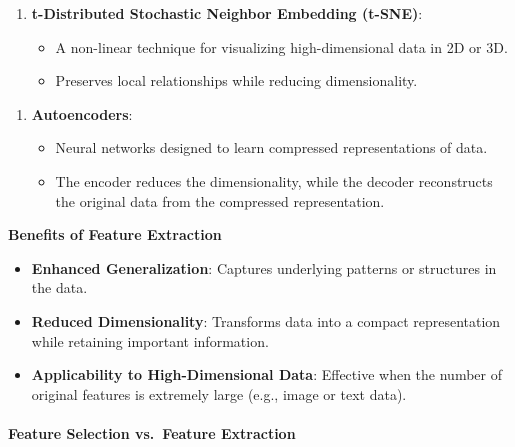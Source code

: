 \documentclass{article}
\providecommand{\tightlist}{%
      \setlength{\itemsep}{0pt}\setlength{\parskip}{0pt}}
\begin{document}
\begin{enumerate}
\def\labelenumi{\arabic{enumi}.}
\setcounter{enumi}{2}
\tightlist
\item
  \textbf{t-Distributed Stochastic Neighbor Embedding (t-SNE)}:

  \begin{itemize}
  \tightlist
  \item
    A non-linear technique for visualizing high-dimensional data in 2D
    or 3D.
  \item
    Preserves local relationships while reducing dimensionality.
  \end{itemize}
\end{enumerate}

\begin{enumerate}
\def\labelenumi{\arabic{enumi}.}
\setcounter{enumi}{3}
\tightlist
\item
  \textbf{Autoencoders}:

  \begin{itemize}
  \tightlist
  \item
    Neural networks designed to learn compressed representations of
    data.
  \item
    The encoder reduces the dimensionality, while the decoder
    reconstructs the original data from the compressed representation.
  \end{itemize}
\end{enumerate}

\textbf{Benefits of Feature Extraction}

\begin{itemize}
\tightlist
\item
  \textbf{Enhanced Generalization}: Captures underlying patterns or
  structures in the data.
\item
  \textbf{Reduced Dimensionality}: Transforms data into a compact
  representation while retaining important information.
\item
  \textbf{Applicability to High-Dimensional Data}: Effective when the
  number of original features is extremely large (e.g., image or text
  data).
\end{itemize}

    \paragraph{Feature Selection vs.~Feature
Extraction}\label{feature-selection-vs.-feature-extraction}
\end{document}
